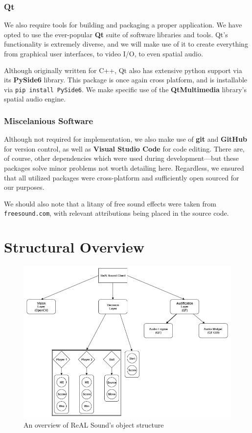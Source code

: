 \documentclass{report}
\newcommand{\rs}{ReAL Sound\xspace}
\newcommand{\tech}[1]{\textbf{#1}}
\begin{document}
\subsubsection{Qt}
We also require tools for building and packaging a proper application. We have opted to use the ever-popular \tech{Qt} suite of software libraries and tools. Qt's functionality is extremely diverse, and we will make use of it to create everything from graphical user interfaces, to video I/O, to even spatial audio.

Although originally written for C++, Qt also has extensive python support via its \tech{PySide6} library. This package is once again cross platform, and is installable via \texttt{pip install PySide6}. We make specific use of the \tech{QtMultimedia} library's spatial audio engine.

\subsubsection{Miscelanious Software}
Although not required for implementation, we also make use of \tech{git} and \tech{GitHub} for version control, as well as \tech{Visual Studio Code} for code editing. There are, of course, other dependencies which were used during development---but these packages solve minor problems not worth detailing here. Regardless, we ensured that all utilized packages were cross-platform and sufficiently open sourced for our purposes. 

We should also note that a litany of free sound effects were taken from \texttt{freesound.com}, with relevant attributions being placed in the source code.

\section{Structural Overview }

\begin{figure}[h]
    \includegraphics[width=\textwidth]{deps.png}
    \caption{An overview of \rs's object structure}
    \label{fig:deps}
\end{figure}
\end{document}
